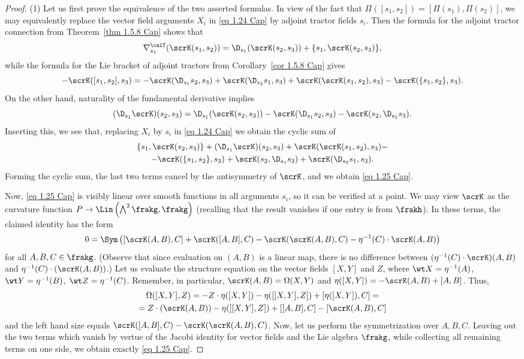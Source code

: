 \begin{proof}
    (1) Let us first prove the equivalence of the two asserted formulas. In view of the fact that $\Pi([s_1,s_2])=[\Pi(s_1),\Pi(s_2)]$, we may equivalently replace the vector field arguments $X_i$ in \eqref{eq 1.24 Cap} by adjoint tractor fields $s_i$. Then the formula for the adjoint tractor connection from Theorem~\ref{thm 1.5.8 Cap} shows that 
    \[\nabla^\calT_{s_1}(\scrK(s_1,s_2))=\D_{s_1}(\scrK(s_2,s_3))+\{s_1,\scrK(s_2,s_3)\},\]
    while the formula for the Lie bracket of adjoint tractors from Corollary~\ref{cor 1.5.8 Cap} gives 
    \[-\scrK([s_1,s_2],s_3)=-\scrK(\D_{s_1}s_2,s_3)+\scrK(\D_{s_2}s_1,s_3)+\scrK(\scrK(s_1,s_2),s_3)-\scrK(\{s_1,s_2\},s_3).\]
    On the other hand, naturality of the fundamental derivative implies 
    \[(\D_{s_1}\scrK)(s_2,s_3)=\D_{s_1}(\scrK(s_2,s_3))-\scrK(\D_{s_1}s_2,s_3)-\scrK(s_2,\D_{s_1}s_3).\]
    Inserting this, we see that, replacing $X_i$ by $s_i$ in \eqref{eq 1.24 Cap} we obtain the cyclic sum of 
    \begin{multline}
        \{s_1,\scrK(s_2,s_3)\}+(\D_{s_1}\scrK)(s_2,s_3)+\scrK(\scrK(s_1,s_2),s_3)-\\
        -\scrK(\{s_1,s_2\},s_3)+\scrK(s_2,\D_{s_1}s_3)+\scrK(\D_{s_2}s_1,s_3).
    \end{multline}
    Forming the cyclic sum, the last two terms cancel by the antisymmetry of $\scrK$, and we obtain \eqref{eq 1.25 Cap}.

    Now, \eqref{eq 1.25 Cap} is visibly linear over smooth functions in all arguments $s_i$, so it can be verified at a point. We may view $\scrK$ as the curvature function $P\to \Lin\left(\bigwedge^2 \frakg,\frakg\right)$ (recalling that the result vanishes if one entry is from $\frakh$). In these terms, the claimed identity has the form 
    \[0=\Sym\left(\left[\scrK(A,B),C\right]+\scrK([A,B],C)-\scrK(\scrK(A,B),C)-\eta^{-1}(C)\cdot \scrK(A,B)\right)\]
    for all $A,B,C\in\frakg$. (Observe that since evaluation on $(A,B)$ is a linear map, there is no difference between $(\eta^{-1}(C)\cdot\scrK)(A,B)$ and $\eta^{-1}(C)\cdot (\scrK(A,B))$.) Let us evaluate the structure equation on the vector fields $[X,Y]$ and $Z$, where $\wt X=\eta^{-1}(A)$, $\wt Y=\eta^{-1}(B)$, $\wt Z=\eta^{-1}(C)$. Remember, in particular, $\scrK(A,B)=\Omega(X,Y)$ and $\eta([X,Y])=-\scrK(A,B)+[A,B]$. Thus, 
    \begin{multline}
        \Omega([X,Y],Z)=-Z\cdot \eta([X,Y])-\eta([[X,Y],Z])+[\eta([X,Y]),C]=\\
        =Z\cdot (\scrK(A,B))-\eta([[X,Y],Z])+[[A,B],C]-[\scrK(A,B),C]
    \end{multline}
    and the left hand size equals $\scrK([A,B],C)-\scrK(\scrK(A,B),C)$. Now, let us perform the symmetrization over $A,B,C$. Leaving out the two terms which vanish by vertue of the Jacobi identity for vector fields and the Lie algebra $\frakg$, while collecting all remaining terms on one side, we obtain exactly \eqref{eq 1.25 Cap}.


\end{proof}
